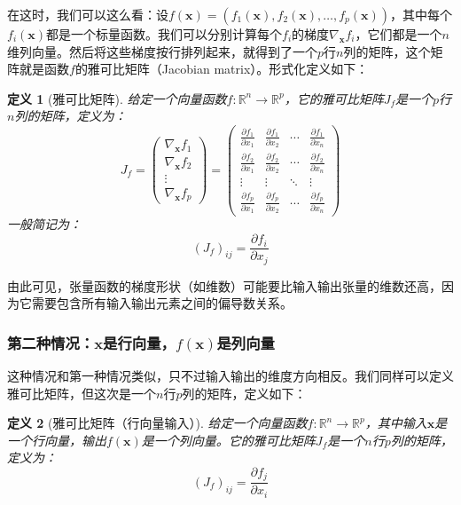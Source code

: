 \documentclass[
    UTF8,
    a4paper,
    12pt
]{ctexart}
\newtheorem{definition}{定义}
\begin{document}
在这时，我们可以这么看：设$f(\mathbf{x}) = (f_1(\mathbf{x}), f_2(\mathbf{x}), \ldots, f_p(\mathbf{x}))$，其中每个$f_i(\mathbf{x})$都是一个标量函数。我们可以分别计算每个$f_i$的梯度$\nabla_\mathbf{x} f_i$，它们都是一个$n$维列向量。然后将这些梯度按行排列起来，就得到了一个$p$行$n$列的矩阵，这个矩阵就是函数$f$的雅可比矩阵（Jacobian matrix）。形式化定义如下：
\begin{definition}[雅可比矩阵]
    给定一个向量函数$f: \mathbb{R}^n \to \mathbb{R}^p$，它的雅可比矩阵$J_f$是一个$p$行$n$列的矩阵，定义为：
    \begin{equation}
        J_f = \begin{pmatrix}
            \nabla_\mathbf{x} f_1 \\
            \nabla_\mathbf{x} f_2 \\
            \vdots \\
            \nabla_\mathbf{x} f_p
        \end{pmatrix} = \begin{pmatrix}
            \frac{\partial f_1}{\partial x_1} & \frac{\partial f_1}{\partial x_2} & \cdots & \frac{\partial f_1}{\partial x_n} \\
            \frac{\partial f_2}{\partial x_1} & \frac{\partial f_2}{\partial x_2} & \cdots & \frac{\partial f_2}{\partial x_n} \\
            \vdots & \vdots & \ddots & \vdots \\
            \frac{\partial f_p}{\partial x_1} & \frac{\partial f_p}{\partial x_2} & \cdots & \frac{\partial f_p}{\partial x_n}
        \end{pmatrix}
    \end{equation}
    一般简记为：
    \begin{equation}
        (J_f)_{ij} = \frac{\partial f_i}{\partial x_j}
    \end{equation}
\end{definition}

由此可见，张量函数的梯度形状（如维数）可能要比输入输出张量的维数还高，因为它需要包含所有输入输出元素之间的偏导数关系。

\subsubsection{第二种情况：$\mathbf{x}$是行向量，$f(\mathbf{x})$是列向量}

这种情况和第一种情况类似，只不过输入输出的维度方向相反。我们同样可以定义雅可比矩阵，但这次是一个$n$行$p$列的矩阵，定义如下：
\begin{definition}[雅可比矩阵（行向量输入）]
    给定一个向量函数$f: \mathbb{R}^n \to \mathbb{R}^p$，其中输入$\mathbf{x}$是一个行向量，输出$f(\mathbf{x})$是一个列向量。它的雅可比矩阵$J_f$是一个$n$行$p$列的矩阵，定义为：
    \begin{equation}
        (J_f)_{ij} = \frac{\partial f_j}{\partial x_i}
    \end{equation}
\end{definition}
\end{document}

